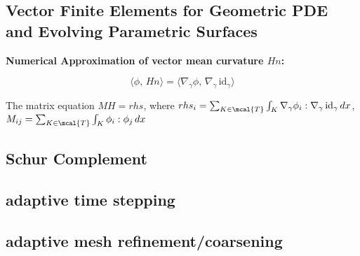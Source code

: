 \documentclass[10pt]{article}
\begin{document}
\subsection{Vector Finite Elements for Geometric PDE and Evolving Parametric Surfaces}

\begin{example}

{\bf Numerical Approximation of vector mean curvature $Hn$:}

\[\langle \phi, \, H n \rangle = \langle \nabla_\gamma \phi, \, \nabla_\gamma\,
\text{id}_\gamma \rangle \]

The matrix equation $MH = rhs$, where $rhs_{i} = \sum_{K \in \mcal{T}} \int_{K} \nabla_{\gamma}
\phi_i : \nabla_{\gamma}\, \text{id}_\gamma \,dx$, $M_{ij} = \sum_{K \in
   \mcal{T}} \int_{K} \phi_i : \phi_j \, dx$  
   
\end{example}

\subsection{Schur Complement}

\subsection{adaptive time stepping}

\subsection{adaptive mesh refinement/coarsening}







\end{document}
